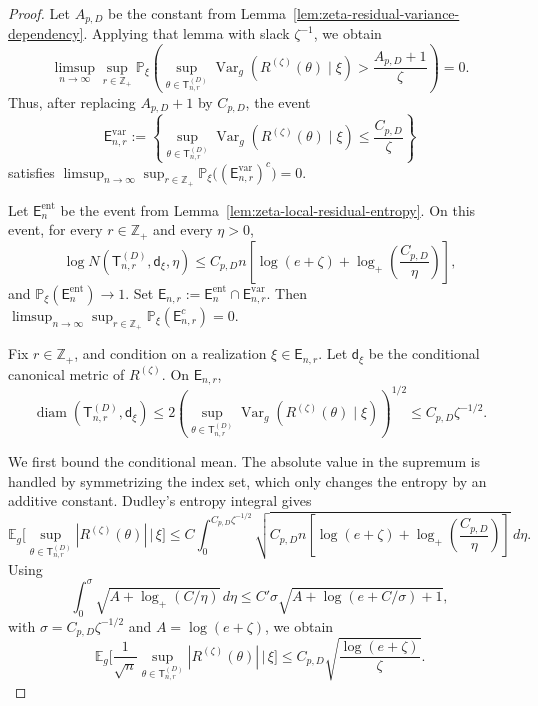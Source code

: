 \documentclass[12pt]{article}
\newcommand{\E}{\mathbb{E}}
\renewcommand{\P}{\mathbb{P}}
\begin{document}
\begin{proof}
Let \(A_{p,D}\) be the constant from
Lemma~\ref{lem:zeta-residual-variance-dependency}. Applying that lemma with
slack \(\zeta^{-1}\), we obtain
\[
\limsup_{n\to\infty}
\sup_{r\in\mathbb Z_+}
\P_\xi\left(
\sup_{\theta\in\mathsf T_{n,r}^{(D)}}
\operatorname{Var}_g\!\left(R^{(\zeta)}(\theta)\mid \xi\right)
>
\frac{A_{p,D}+1}{\zeta}
\right)
=0.
\]
Thus, after replacing \(A_{p,D}+1\) by \(C_{p,D}\), the event
\[
\mathsf E_{n,r}^{\mathrm{var}}
:=
\left\{
\sup_{\theta\in\mathsf T_{n,r}^{(D)}}
\operatorname{Var}_g\!\left(R^{(\zeta)}(\theta)\mid \xi\right)
\le
\frac{C_{p,D}}{\zeta}
\right\}
\]
satisfies $\limsup_{n\to\infty}
\sup_{r\in\mathbb Z_+}
\P_\xi\bigl((\mathsf E_{n,r}^{\mathrm{var}})^c\bigr)=0$.

Let \(\mathsf E_n^{\mathrm{ent}}\) be the event from
Lemma~\ref{lem:zeta-local-residual-entropy}. On this event, for every
\(r\in\mathbb Z_+\) and every \(\eta>0\),
\[
\log N(\mathsf T_{n,r}^{(D)},\mathsf d_\xi,\eta)
\le
C_{p,D} n
\left[
    \log(e+\zeta)
    +
    \log_+\left(\frac{C_{p,D}}{\eta}\right)
\right],
\]
and \(\P_\xi(\mathsf E_n^{\mathrm{ent}})\to1\). Set $\mathsf E_{n,r}:=\mathsf E_n^{\mathrm{ent}}
    \cap \mathsf E_{n,r}^{\mathrm{var}}$. Then $\limsup_{n\to\infty}
\sup_{r\in\mathbb Z_+}
\P_\xi(\mathsf E_{n,r}^c)=0$.

Fix \(r\in\mathbb Z_+\), and condition on a realization
\(\xi\in\mathsf E_{n,r}\). Let \(\mathsf d_\xi\) be the conditional canonical
metric of \(R^{(\zeta)}\). On \(\mathsf E_{n,r}\),
\[
\operatorname{diam}(\mathsf T_{n,r}^{(D)},\mathsf d_\xi)
\le
2
\left(
\sup_{\theta\in\mathsf T_{n,r}^{(D)}}
\operatorname{Var}_g(R^{(\zeta)}(\theta)\mid \xi)
\right)^{1/2}
\le
C_{p,D}\zeta^{-1/2}.
\]

We first bound the conditional mean. The absolute value in the supremum is
handled by symmetrizing the index set, which only changes the entropy by an
additive constant. Dudley's entropy integral gives
\[
\E_g\big[
\sup_{\theta\in\mathsf T_{n,r}^{(D)}}
|R^{(\zeta)}(\theta)|
\,\big|\,\xi
\big]
\le
C
\int_0^{C_{p,D}\zeta^{-1/2}}
\sqrt{
C_{p,D} n
\left[
    \log(e+\zeta)
    +
    \log_+\left(\frac{C_{p,D}}{\eta}\right)
\right]
}
\,d\eta .
\]
Using
\[
    \int_0^\sigma
    \sqrt{A+\log_+(C/\eta)}\,d\eta
    \le
    C'\sigma\sqrt{A+\log(e+C/\sigma)+1},
\]
with \(\sigma=C_{p,D}\zeta^{-1/2}\) and \(A=\log(e+\zeta)\), we obtain
\[
\E_g\big[
\frac1{\sqrt n}
\sup_{\theta\in\mathsf T_{n,r}^{(D)}}
|R^{(\zeta)}(\theta)|
\,\big|\,\xi
\big]
\le
C_{p,D}
\sqrt{\frac{\log(e+\zeta)}{\zeta}}.
\]


\end{proof}
\end{document}
